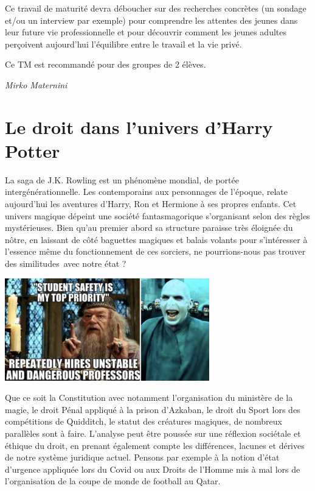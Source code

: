 \documentclass[
  10pt,
  french,
  a5paper,
  openany]{book}
\newenvironment{signature}{\begin{flushright}}{\end{flushright}}
\begin{document}
Ce travail de maturité devra déboucher sur des recherches concrètes (un sondage et/ou un interview par exemple) pour comprendre les attentes des jeunes dans leur future vie professionnelle et pour découvrir comment les jeunes adultes perçoivent aujourd'hui l'équilibre entre le travail et la vie privé.

Ce TM est recommandé pour des groupes de 2 élèves.

\begin{signature}
\emph{Mirko Maternini}

\end{signature}

\hypertarget{le-droit-dans-lunivers-dharry-potter}{%
\chapter{Le droit dans l'univers d'Harry Potter}\label{le-droit-dans-lunivers-dharry-potter}}

La saga de J.K. Rowling est un phénomène mondial, de portée intergénérationnelle. Les contemporains aux personnages de l'époque, relate aujourd'hui les aventures d'Harry, Ron et Hermione à ses propres enfants. Cet univers magique dépeint une société fantasmagorique s'organisant selon des règles mystérieuses. Bien qu'au premier abord sa structure paraisse très éloignée du nôtre, en laissant de côté baguettes magiques et balais volants pour s'intéresser à l'essence même du fonctionnement de ces sorciers, ne pourrions-nous pas trouver des similitudes~avec notre état ?

\begin{center}
\includegraphics[width=\textwidth,height=12em]{images/le-droit-dans-lunivers-dharry-potter-1.jpg}

\end{center}

Que ce soit la Constitution avec notamment l'organisation du ministère de la magie, le droit Pénal appliqué à la prison d'Azkaban, le droit du Sport lors des compétitions de Quidditch, le statut des créatures magiques, de nombreux parallèles sont à faire. L'analyse peut être poussée sur une réflexion sociétale et éthique du droit, en prenant également compte les différences, lacunes et dérives de notre système juridique actuel. Pensons par exemple à la notion d'état d'urgence appliquée lors du Covid ou aux Droits de l'Homme mis à mal lors de l'organisation de la coupe de monde de football au Qatar.
\end{document}
